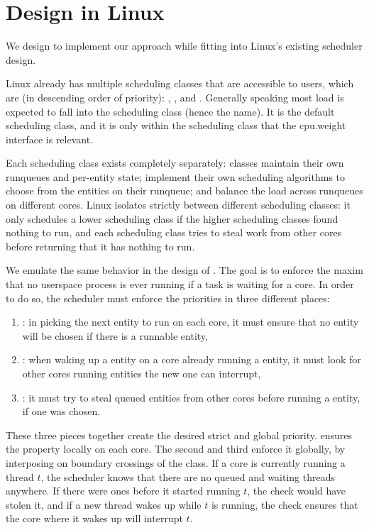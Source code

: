 \section{\beclass{} Design in Linux}\label{s:design}

We design \beclass{} to implement our approach while fitting into Linux's existing
scheduler design.

Linux already has multiple scheduling classes that are accessible to users,
which are (in descending order of priority): \deadlineclass{}, \rtclass{}, and
\normalclass{}. Generally speaking most load is expected to fall into the
\normalclass{} scheduling class (hence the name). It is the default scheduling
class, and it is only within the \normalclass{} scheduling class that the
\cgroups{} cpu.weight interface is relevant.

Each scheduling class exists completely separately: classes maintain their own
runqueues and per-entity state; implement their own scheduling algorithms to
choose from the entities on their runqueue; and balance the load across
runqueues on different cores. Linux isolates strictly between different
scheduling classes: it only schedules a lower scheduling class if the higher
scheduling classes found nothing to run, and each scheduling class tries to
steal work from other cores before returning that it has nothing to run. 

We emulate the same behavior in the design of \beclass{}. The goal is to enforce
the maxim that no \beclass{} userspace process is ever running if a
\normalclass{} task is waiting for a core. In order to do so, the scheduler must
enforce the priorities in three different places:
\begin{enumerate}
    \item \local: in picking the next entity to run on each core, it must ensure
        that no \beclass{} entity will be chosen if there is a runnable
        \normalclass{} entity,
    \item \entry: when waking up a \normalclass{} entity on a core already
        running a \normalclass{} entity, it must look for other cores running
        \beclass{} entities the new one can interrupt,
    \item \exit: it must try to steal queued \normalclass{} entities from other
        cores before running a \beclass{} entity, if one was chosen.
\end{enumerate}

These three pieces together create the desired strict and global priority.
\local{} ensures the property locally on each core. The second and third enforce
it globally, by interposing on boundary crossings of the \normalclass{} class.
If a core is currently running a \beclass{} thread $t$, the scheduler knows that
there are no queued and waiting \normalclass{} threads anywhere. If there were
ones before it started running $t$, the \exit{} check would have stolen it, and
if a new \normalclass{} thread wakes up while $t$ is running, the \entry{} check
ensures that the core where it wakes up will interrupt $t$.

